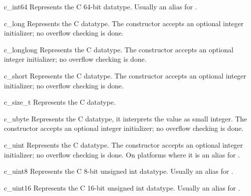 \begin{classdesc*}{c_int64}
Represents the C 64-bit  datatype. Usually an alias
for .
\end{classdesc*}

\begin{classdesc*}{c_long}
Represents the C  datatype. The constructor accepts an
optional integer initializer; no overflow checking is done.
\end{classdesc*}

\begin{classdesc*}{c_longlong}
Represents the C  datatype. The constructor accepts
an optional integer initializer; no overflow checking is done.
\end{classdesc*}

\begin{classdesc*}{c_short}
Represents the C  datatype. The constructor accepts an
optional integer initializer; no overflow checking is done.
\end{classdesc*}

\begin{classdesc*}{c_size_t}
Represents the C  datatype.
\end{classdesc*}

\begin{classdesc*}{c_ubyte}
Represents the C  datatype, it interprets the
value as small integer. The constructor accepts an optional
integer initializer; no overflow checking is done.
\end{classdesc*}

\begin{classdesc*}{c_uint}
Represents the C  datatype. The constructor accepts an
optional integer initializer; no overflow checking is done. On
platforms where  it is an alias for
.
\end{classdesc*}

\begin{classdesc*}{c_uint8}
Represents the C 8-bit unsigned int datatype. Usually an alias for
.
\end{classdesc*}

\begin{classdesc*}{c_uint16}
Represents the C 16-bit unsigned int datatype. Usually an alias for
.
\end{classdesc*}

